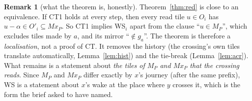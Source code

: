 \documentclass[11pt]{article}
\theoremstyle{definition}\newtheorem{definition}[theorem]{Definition}\newtheorem{remark}[theorem]{Remark}
\begin{document}
\begin{remark}[what the theorem is, honestly]\label{rem:honest}
Theorem~\ref{thm:red} is close to an equivalence. If CT1 holds at every step, then every read tile $u\in O_i$ has $u-\alpha\in O'_i\subseteq Mx_P$. So CT1 implies WS$_i$ apart from the clause ``$u\in M_P$'', which excludes tiles made by $a$, and its mirror ``$\notin g_a$''.
The theorem is therefore a \emph{localisation}, not a proof of CT. It removes the history (the crossing's own tiles translate automatically, Lemma~\ref{lem:hist}) and the tie-break (Lemma~\ref{lem:acr}).
What remains is a statement about \emph{the tiles of $M_P$ and $Mx_P$ that the crossing reads}. Since $M_P$ and $Mx_P$ differ exactly by $x$'s journey (after the same prefix), WS is a statement about $x$'s wake at the place where $y$ crosses it, which is the form the brief asked to have named.
\end{remark}
\end{document}
